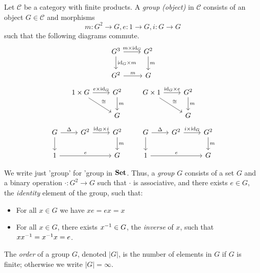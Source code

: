 \begin{df}[Group]
Let $\mathcal{C}$ be a category with finite products. A \emph{group (object)} in $\mathcal{C}$ consists of an object $G \in \mathcal{C}$ and morphisms
\[ m : G^2 \rightarrow G, e : 1 \rightarrow G, i : G \rightarrow G \]
such that the following diagrams commute.
\[ \begin{tikzcd}
G^3 \arrow[r,"m \times \id{G}"] \arrow[d,"\id{G} \times m"] & G^2 \arrow[d,"m"] \\
G^2 \arrow[r,"m"] & G
\end{tikzcd} \]
\[ \begin{tikzcd}
1 \times G \arrow[r,"e \times \id{G}"] \arrow[dr,"\cong"] & G^2 \arrow[d,"m"] \\
& G
\end{tikzcd}
\qquad
\begin{tikzcd}
G \times 1 \arrow[r,"\id{G} \times e"] \arrow[dr,"\cong"] & G^2 \arrow[d,"m"] \\
& G
\end{tikzcd} \]
\[ \begin{tikzcd}
G \arrow[r,"\Delta"] \arrow[d] & G^2 \arrow[r,"\id{G} \times i"] & G^2 \arrow[d,"m"] \\
1 \arrow[rr,"e"] & & G
\end{tikzcd}
\qquad
\begin{tikzcd}
G \arrow[r,"\Delta"] \arrow[d] & G^2 \arrow[r,"i \times \id{G}"] & G^2 \arrow[d,"m"] \\
1 \arrow[rr,"e"] & & G
\end{tikzcd} \]
\end{df}

\begin{df}[Group]
We write just 'group' for 'group in $\mathbf{Set}$. Thus, a \emph{group} $G$ consists of a set $G$ and a binary operation $\cdot : G^2 \rightarrow G$ such that $\cdot$ is associative, and there exists $e \in G$, the \emph{identity} element of the group, such that:
    \begin{itemize}
        \item For all $x \in G$ we have $xe = ex = x$
        \item For all $x \in G$, there exists ${x}^{-1} \in G$, the \emph{inverse} of $x$,
              such that $x {x}^{-1} = {x}^{-1} x = e$.
    \end{itemize}

    The \emph{order} of a group $G$, denoted $|G|$, is the number of elements in
    $G$ if $G$ is finite; otherwise we write $|G| = \infty$.
\end{df}

